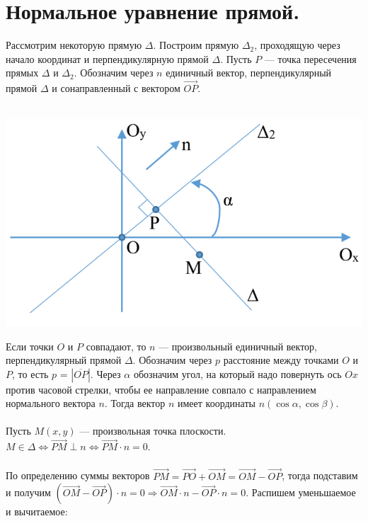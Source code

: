 \section{Нормальное уравнение прямой.}
Рассмотрим некоторую прямую $\Delta$. Построим прямую $\Delta_2$, проходящую через начало координат и перпендикулярную прямой $\Delta$. Пусть $P$ --- точка пересечения прямых $\Delta$ и $\Delta_2$. Обозначим через $n$ единичный вектор, перпендикулярный прямой $\Delta$ и сонаправленный с вектором $\overrightarrow{OP}$. \\\\
\begin{center}
	\includegraphics[scale=0.4]{images/pic3_2.png}
\end{center}
Если точки $O$ и $P$ совпадают, то $n$ --- произвольный единичный вектор, перпендикулярный прямой $\Delta$. Обозначим через $p$ расстояние между точками $O$ и $P$, то есть $p$ = $|\overline{OP}|$. Через $\alpha$ обозначим угол, на который надо повернуть ось $Ox$ против часовой стрелки, чтобы ее направление совпало с направлением нормального вектора $n$. Тогда вектор $n$ имеет координаты $n(\cos \alpha, \cos \beta)$. \\\\
Пусть $M(x, y)$ --- произвольная точка плоскости. $M\in\Delta\Longleftrightarrow\overrightarrow{PM}\perp n\Longleftrightarrow\overrightarrow{PM}\cdot n = 0.$ \\\\
По определению суммы векторов $\overrightarrow{PM} = \overrightarrow{PO} + \overrightarrow{OM} = \overrightarrow{OM} - \overrightarrow{OP}$, тогда подставим и получим $(\overrightarrow{OM} - \overrightarrow{OP})\cdot n = 0 \Rightarrow \overrightarrow{OM} \cdot n - \overrightarrow{OP} \cdot n = 0.$ Распишем уменьшаемое и вычитаемое: \\
